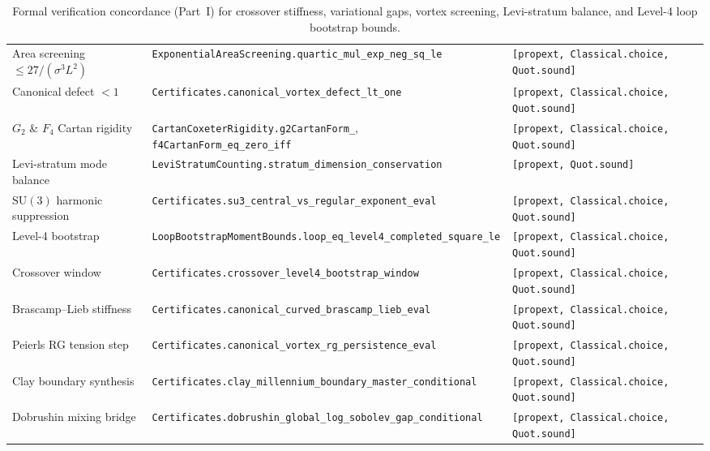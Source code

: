 \documentclass[11pt,a4paper]{article}
\newcommand{\SU}{\mathrm{SU}}
\begin{document}
\begin{table}[ht]
\begin{tabular}{@{}p{4.3cm}p{6.6cm}p{3.4cm}@{}}
Area screening $\le 27/(\sigma^3 L^2)$ & \texttt{ExponentialAreaScreening.}\newline\texttt{quartic\_mul\_exp\_neg\_sq\_le} & \texttt{[propext, Classical.choice,} \texttt{Quot.sound]} \\
Canonical defect $< 1$ & \texttt{Certificates.}\newline\texttt{canonical\_vortex\_defect\_lt\_one} & \texttt{[propext, Classical.choice,} \texttt{Quot.sound]} \\
$G_2$ \& $F_4$ Cartan rigidity & \texttt{CartanCoxeterRigidity.}\newline\texttt{g2CartanForm\_}, \texttt{f4CartanForm\_eq\_zero\_iff} & \texttt{[propext, Classical.choice,} \texttt{Quot.sound]} \\
Levi-stratum mode balance & \texttt{LeviStratumCounting.}\newline\texttt{stratum\_dimension\_conservation} & \texttt{[propext, Quot.sound]} \\
$\SU(3)$ harmonic suppression & \texttt{Certificates.}\newline\texttt{su3\_central\_vs\_regular\_exponent\_eval} & \texttt{[propext, Classical.choice,} \texttt{Quot.sound]} \\
Level-4 bootstrap & \texttt{LoopBootstrapMomentBounds.}\newline\texttt{loop\_eq\_level4\_completed\_square\_le} & \texttt{[propext, Classical.choice,} \texttt{Quot.sound]} \\
Crossover window & \texttt{Certificates.}\newline\texttt{crossover\_level4\_bootstrap\_window} & \texttt{[propext, Classical.choice,} \texttt{Quot.sound]} \\
Brascamp--Lieb stiffness & \texttt{Certificates.}\newline\texttt{canonical\_curved\_brascamp\_lieb\_eval} & \texttt{[propext, Classical.choice,} \texttt{Quot.sound]} \\
Peierls RG tension step & \texttt{Certificates.}\newline\texttt{canonical\_vortex\_rg\_persistence\_eval} & \texttt{[propext, Classical.choice,} \texttt{Quot.sound]} \\
Clay boundary synthesis & \texttt{Certificates.}\newline\texttt{clay\_millennium\_boundary\_master\_conditional} & \texttt{[propext, Classical.choice,} \texttt{Quot.sound]} \\
Dobrushin mixing bridge & \texttt{Certificates.}\newline\texttt{dobrushin\_global\_log\_sobolev\_gap\_conditional} & \texttt{[propext, Classical.choice,} \texttt{Quot.sound]} \\
\bottomrule
\end{tabular}
\caption{Formal verification concordance (Part~I) for crossover stiffness, variational gaps, vortex screening, Levi-stratum balance, and Level-4 loop bootstrap bounds.}
\label{tab:paper4-concordance}
\end{table}
\end{document}
